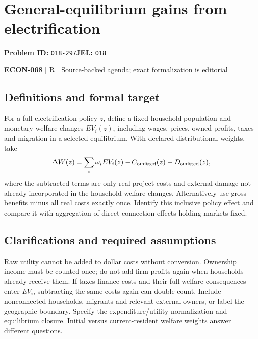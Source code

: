 \documentclass[11pt,a4paper]{article}
\begin{document}
\section*{General-equilibrium gains from electrification}
\textbf{Problem ID:} \texttt{O18-297}\quad \textbf{JEL:} \texttt{O18}\par
\label{problem:OP-0637}


\label{audited:ECON-068}

{\sffamily\small\color{muted}\textbf{ECON-068} | R | Source-backed agenda; exact formalization is editorial\par}

\subsection*{Definitions and formal target}

For a full electrification policy \(z\), define a fixed household population and monetary welfare changes \(EV_i(z)\), including wages, prices, owned profits, taxes and migration in a selected equilibrium. With declared distributional weights, take
\[
 \Delta W(z)=\sum_i\omega_iEV_i(z)-C_{\rm omitted}(z)-D_{\rm omitted}(z),
\]
where the subtracted terms are only real project costs and external damage not already incorporated in the household welfare changes. Alternatively use gross benefits minus all real costs exactly once. Identify this inclusive policy effect and compare it with aggregation of direct connection effects holding markets fixed.

\subsection*{Clarifications and required assumptions}

Raw utility cannot be added to dollar costs without conversion. Ownership income must be counted once; do not add firm profits again when households already receive them. If taxes finance costs and their full welfare consequences enter \(EV_i\), subtracting the same costs again can double-count. Include nonconnected households, migrants and relevant external owners, or label the geographic boundary. Specify the expenditure/utility normalization and equilibrium closure. Initial versus current-resident welfare weights answer different questions.
\end{document}
